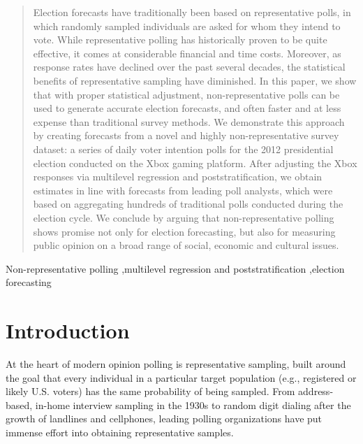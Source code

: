\documentclass[preprint,authoryear,12pt]{elsarticle}
\begin{document}
\begin{frontmatter}
\begin{abstract}
  Election forecasts have traditionally been based on representative polls,
  in which randomly sampled individuals are asked for whom they intend to vote.
  While representative polling has historically proven to be quite effective, it
  comes at considerable financial and time costs. Moreover, as response rates have declined
  over the past several decades, the statistical benefits of representative
  sampling have diminished.
  In this paper, we show that with proper statistical
  adjustment, non-representative polls can be used to generate accurate election
  forecasts, and often faster and at less expense than traditional survey
  methods.  We demonstrate this approach by creating forecasts from a novel and
  highly non-representative survey dataset: a series of daily voter intention
  polls for the 2012 presidential election conducted on the Xbox gaming platform.
  After adjusting the Xbox responses via multilevel regression and
  poststratification, we obtain estimates in line with forecasts from leading
  poll analysts, which were based on aggregating hundreds of traditional polls
  conducted during the election cycle. We conclude by arguing that
  non-representative polling shows promise not only for election forecasting, but
  also for measuring public opinion on a broad range of social, economic and
  cultural issues.
\end{abstract}

\begin{keyword}

  Non-representative polling \sep multilevel regression and poststratification
  \sep election forecasting
\end{keyword}

\end{frontmatter}


\section{Introduction}
At the heart of modern opinion polling is representative sampling, built around
the goal that every individual in a particular target population (e.g., registered or likely U.S. voters)
has the same probability of being sampled. From address-based,
in-home interview sampling in the 1930s to random digit dialing after the growth
of landlines and cellphones, leading polling organizations have put immense
effort into obtaining %
representative samples.
\end{document}
